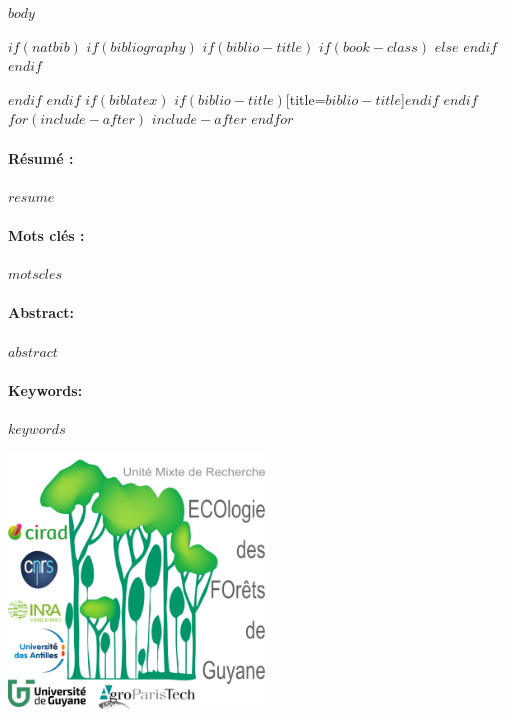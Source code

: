 \documentclass[$if(fontsize)$$fontsize$,$endif$$if(lang)$$babel-lang$,$endif$$if(papersize)$$papersize$,$endif$$for(classoption)$$classoption$$sep$,$endfor$]{article}
\makeatletter
\def\maxwidth{\ifdim\Gin@nat@width>\linewidth\linewidth
\else\Gin@nat@width\fi}
\let\Oldincludegraphics\includegraphics
\renewcommand{\includegraphics}[1]{\Oldincludegraphics[width=\maxwidth]{#1}}
\makeatother
\begin{document}
$body$
\newpage

\singlespacing
$if(natbib)$
$if(bibliography)$
$if(biblio-title)$
$if(book-class)$
\renewcommand\bibname{$biblio-title$}
$else$
\renewcommand\refname{$biblio-title$}
$endif$
$endif$

$endif$
$endif$
$if(biblatex)$
\printbibliography$if(biblio-title)$[title=$biblio-title$]$endif$
$endif$
$for(include-after)$
$include-after$
$endfor$
\newpage

\listoffigures
\newpage

\listoftables
\newpage

\paragraph{Résumé :}
$resume$
\paragraph{Mots clés :} $motscles$
\newline\newline
\paragraph{Abstract:}
$abstract$
\paragraph{Keywords:} $keywords$

\vspace*{\fill}
\includegraphics{logo}
\end{document}
